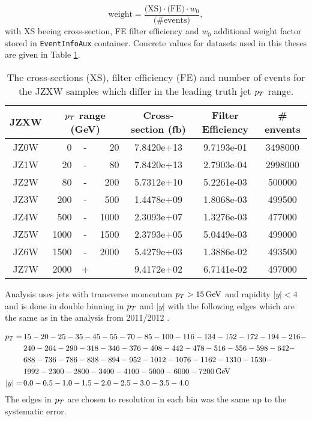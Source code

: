 \begin{equation}
  \text{weight} = \frac{\text{(XS)} \cdot \text{(FE)} \cdot w_0}{\text{(\# events)}},
\end{equation}
with XS beeing cross-section, FE filter efficiency and $w_0$ additional weight
factor stored in \texttt{EventInfoAux} container. Concrete values for datasets used in
this theses are given in Table \ref{tab:JZXW}.  

\begin{table}
  \centering
  \begin{tabular}{|c|rcr|c|c|c|}
    \hline 
     JZXW & \multicolumn{3}{|c|}{$p_{T}$ range (GeV)} & Cross-section (fb) & Filter Efficiency & \# envents  \\ 
    \hline
    \hline
		 JZ0W &     0 & - &    20 & 7.8420e+13 & 9.7193e-01 & 3498000 \\ 
    \hline
		 JZ1W &    20 & - &    80 & 7.8420e+13 & 2.7903e-04 & 2998000 \\
    \hline
		 JZ2W &    80 & - &   200 & 5.7312e+10 & 5.2261e-03 & 500000  \\
    \hline
		 JZ3W &   200 & - &   500 & 1.4478e+09 & 1.8068e-03 & 499500  \\
    \hline
		 JZ4W &   500 & - &  1000 & 2.3093e+07 & 1.3276e-03 & 477000  \\
    \hline
		 JZ5W &  1000 & - &  1500 & 2.3793e+05 & 5.0449e-03 & 499000  \\
    \hline
		 JZ6W &  1500 & - &  2000 & 5.4279e+03 & 1.3886e-02 & 493500  \\
    \hline
		 JZ7W &  2000 & + &       & 9.4172e+02 & 6.7141e-02 & 497000  \\
    \hline 
  \end{tabular}
  \caption{The cross-sections (XS), filter efficiency (FE) and number of events
  for the JZXW samples which differ in the leading truth jet $p_{T}$ range.}
  \label{tab:JZXW}
\end{table}

Analysis uses jets with transverse momentum $p_{T} > 15\,\text{GeV}$ and rapidity $|y| <
4$ and is done in double binning in $p_{T}$ and $|y|$ with the following edges
which are the same as in the analysis from 2011/2012 \cite{Analysis2012}.

\begin{align}
  p_{T} = \, &15-20-25-35-45-55-70-85-100-116-134-152-172-194-216- \nonumber \\
        &240-264-290-318-346-376-408-442-478-516-556-598-642- \nonumber \\
        &688-736-786-838-894-952-1012-1076-1162-1310-1530- \nonumber \\
        &1992-2300-2800-3400-4100-5000-6000-7200 \,\text{GeV} \nonumber \\
  |y| = \, &0.0-0.5-1.0-1.5-2.0-2.5-3.0-3.5-4.0
  \label{eq:Binning}
\end{align}
The edges in $p_{T}$ are chosen to resolution in each bin was the same up to the
systematic error.

